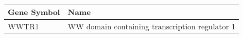 \begin{tabular}{ll}
\toprule
Gene Symbol &                                           Name \\
\midrule
      WWTR1 & WW domain containing transcription regulator 1 \\
\bottomrule
\end{tabular}
